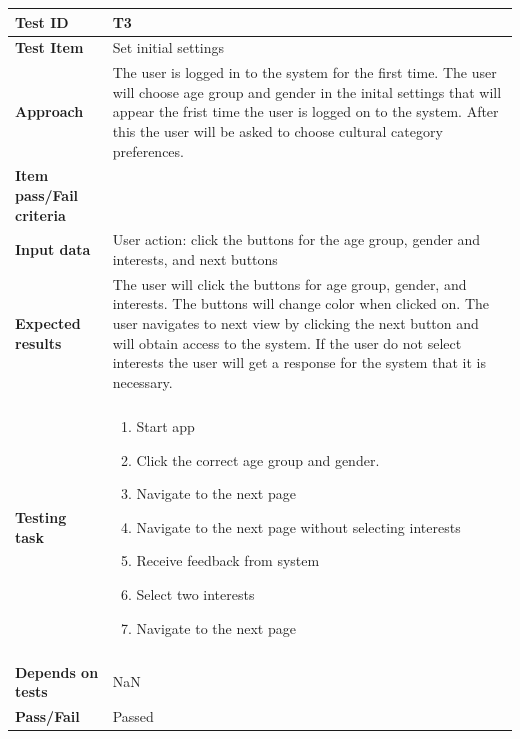 \begin{appendices}
	\begin{table}[H]
		\centering
		\begin{tabular}{ | l | l |}			
			\hline
			\textbf{Test ID} & T3  \\ \hline
			\textbf{Test Item} & Set initial settings \\ \hline
			\textbf{Approach} & \begin{minipage}{5in}The user is logged in to the system for the first time. The user will choose age group and gender in the inital settings that will appear the frist time the user is logged on to the system. After this the user will be asked to choose cultural category preferences.  \end{minipage}\\ \hline
			\textbf{Item pass/Fail criteria} & \\ \hline
			\textbf{Input data} & \begin{minipage}{5in} User action: click the buttons for the age group, gender and interests, and next buttons  \end{minipage}\\ \hline
			\textbf{Expected results} & \begin{minipage}{5in}The user will click the buttons for age group, gender, and interests. The buttons will change color when clicked on. The user navigates to next view by clicking the next button and will obtain access to the system. If the user do not select interests the user will get a response for the system that it is necessary. \end{minipage}\\ \hline&\\[-3.8ex]
			\textbf{Testing task} & \begin{minipage}{5in}
			\begin{enumerate}[noitemsep]
				\item Start app
				\item Click the correct age group and gender.
				\item Navigate to the next page
				\item Navigate to the next page without selecting interests
				\item Receive feedback from system
				\item Select two interests
				\item Navigate to the next page
			\end{enumerate}\end{minipage}
			\\ &\\[-3.8ex]\hline
			\textbf{Depends on tests} & NaN \\ \hline	
			\textbf{Pass/Fail} & Passed \\\hline				
		\end{tabular}


\end{table}
\end{appendices}
